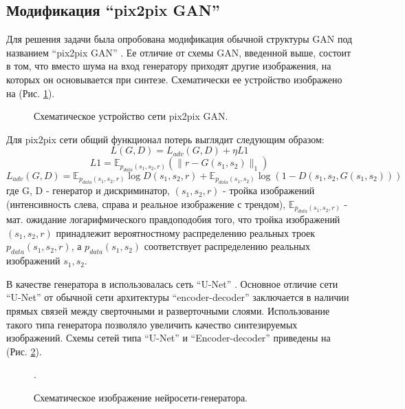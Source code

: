 	\subsection{Модификация ``pix2pix GAN''}
		Для решения задачи была опробована модификация обычной структуры GAN под названием ``pix2pix GAN'' \cite{pix2pix, p2p-vessnet}. Ее отличие от схемы GAN, введенной выше, состоит в том, что вместо шума на вход генератору приходят другие изображения, на которых он основывается при синтезе. Схематически ее устройство изображено на (Рис. \ref{5-p2p}).
			
		\begin{figure}[h]
			\caption{Схематическое устройство сети pix2pix GAN.}
			\label{5-p2p}
		\end{figure}
			
		Для pix2pix сети общий функционал потерь выглядит следующим образом: $$ L(G, D) = L_{adv}(G, D) + \eta L1$$
		$$L1 = \mathbb{E}_{p_{data}(s_1, s_2, r)} (\parallel r - G(s_1, s_2) \parallel_1)$$
		$$ L_{adv}(G, D) = \mathbb{E}_{p_{data}(s_1, s_2, r)}\log D(s_1, s_2, r) +  \mathbb{E}_{p_{data}(s_1, s_2)} \log (1 - D(s_1, s_2, G(s_1, s_2)))$$
		где G, D - генератор и дискриминатор, $(s_1, s_2, r)$ - тройка изображений (интенсивность слева, справа и реальное изображение с трендом),  $\mathbb{E}_{p_{data}(s_1, s_2, r)}$ - мат. ожидание логарифмического правдоподобия того, что тройка изображений $(s_1, s_2, r)$ принадлежит вероятностному распределению реальных троек $p_{data}(s_1, s_2, r)$, а $p_{data}(s_1, s_2)$ соответствует распределению реальных изображений $s_1, s_2$.
			
		В качестве генератора в \cite{pix2pix, p2p-vessnet} использовалась сеть ``U-Net'' \cite{unet}. Основное отличие сети ``U-Net'' от обычной сети архитектуры ``encoder-decoder'' заключается в наличии прямых связей между сверточными и разверточными слоями. Использование такого типа генератора позволяло увеличить качество синтезируемых изображений. Схемы сетей типа ``U-Net'' и ``Encoder-decoder'' приведены на (Рис. \ref{5-unet-sheme}).
		\begin{figure}[h]
			\caption{Схематическое изображение нейросети-генератора.}
			\label{5-unet-sheme}.
		\end{figure}